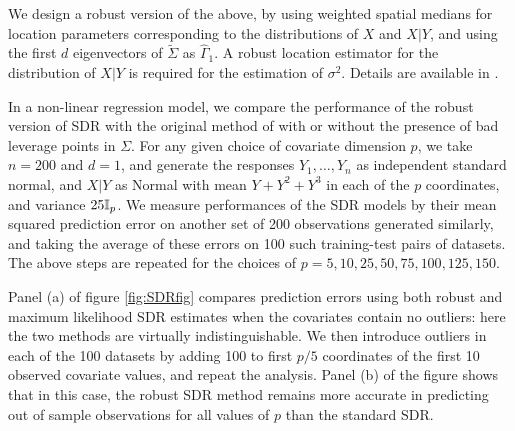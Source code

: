 We design a robust version of the above, by using weighted spatial medians for location 
parameters corresponding to the distributions of $X$ and $X | Y$, and using the first $d$ 
eigenvectors of $\tilde{\Sigma}$ as $\hat\Gamma_{1}$. A robust location estimator for 
the distribution of $X | Y$ is required for the estimation of $\sigma^2$. 
Details are available in \cite{ref:PhilTransRoyalSoc094385_AdragniCook}.

In a non-linear regression model, we compare the performance of the robust version of 
SDR with the original method of 
\cite{ref:PhilTransRoyalSoc094385_AdragniCook} 
with or without the presence of bad leverage points in $\Sigma$. 
For any given choice of covariate dimension $p$, we take $n=200$ and $d=1$, 
and generate the responses 
$Y_1, \ldots, Y_n$ as independent standard normal, and 
$X | Y$ as Normal with mean $Y + Y^{2} + Y^3$ in each of the $p$ coordinates, 
and variance $25 {\mathbb{I}}_p$.
We measure performances of the SDR models by their mean squared prediction error on 
another set of 200 observations  generated similarly, and taking the average of these 
errors on 100 such training-test pairs of datasets. The above steps 
are repeated for the choices of $p = 5, 10, 25, 50, 75, 100, 125, 150$.

Panel (a) of figure \ref{fig:SDRfig} compares prediction errors using both robust and 
maximum likelihood SDR estimates when the covariates contain no outliers: here the two 
methods are virtually indistinguishable. We then introduce outliers in each of the 100 
datasets by adding 100 to first $p/5$ coordinates of the first 10 observed covariate 
values, and repeat the analysis. Panel (b) of the figure shows that in this case, the robust SDR method remains more accurate in predicting out of sample observations for all values of $p$ than 
the standard SDR.



